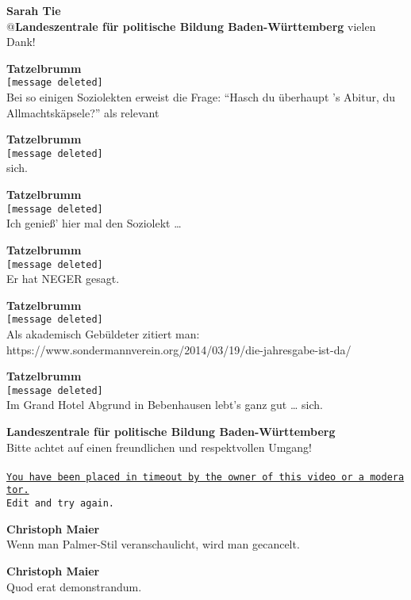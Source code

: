 \documentclass[a4,parindent=0pt]{article}
\let\oldparagraph\paragraph
\renewcommand{\paragraph}[1]{\oldparagraph{#1}\mbox{}}
\begin{document}
\textbf{Sarah Tie}\\
@\textbf{Landeszentrale für politische Bildung Baden-Württemberg} vielen
Dank!

\textbf{Tatzelbrumm}\\
\texttt{{[}message\ deleted{]}}\\
Bei so einigen Soziolekten\cite{soziolekt} erweist die
Frage: ``Hasch du überhaupt 's Abitur\cite{details}, du Allmachtskäpsele?''\cite{kaepsele} als relevant

\textbf{Tatzelbrumm}\\
\texttt{{[}message\ deleted{]}}\\
sich\cite{reflexivum}.

\textbf{Tatzelbrumm}\\
\texttt{{[}message\ deleted{]}}\\
Ich genieß' hier mal den Soziolekt\cite{soziolekt}
\ldots{}

\textbf{Tatzelbrumm}\\
\texttt{{[}message\ deleted{]}}\\
Er hat NEGER gesagt.\cite{neger}

\textbf{Tatzelbrumm}\\
\texttt{{[}message\ deleted{]}}\\
Als akademisch Gebüldeter\cite{gebueldet} zitiert man:\\
https://www.sondermannverein.org/2014/03/19/die-jahresgabe-ist-da/\cite{sondermann}

\textbf{Tatzelbrumm}\\
\texttt{{[}message\ deleted{]}}\\
Im Grand Hotel Abgrund\cite{grandhotelabgrund} in
Bebenhausen lebt's ganz gut \ldots{}
sich\cite{reflexivum}.

\textbf{Landeszentrale für politische Bildung Baden-Württemberg}\\
Bitte achtet auf einen freundlichen und respektvollen Umgang!
\paragraph{\label{timeout}}
\href{https://youtu.be/jSiCjzEgx1k?t=23}{\texttt{You\ have\ been\ placed\ in\ timeout\ by\ the\ owner\ of\ this\ video\ or\ a\ moderator.}}\\
\texttt{Edit\ and\ try\ again.}

\textbf{Christoph Maier}\\
Wenn man Palmer-Stil veranschaulicht, wird man gecancelt.

\textbf{Christoph Maier}\\
Quod erat demonstrandum.
\end{document}
